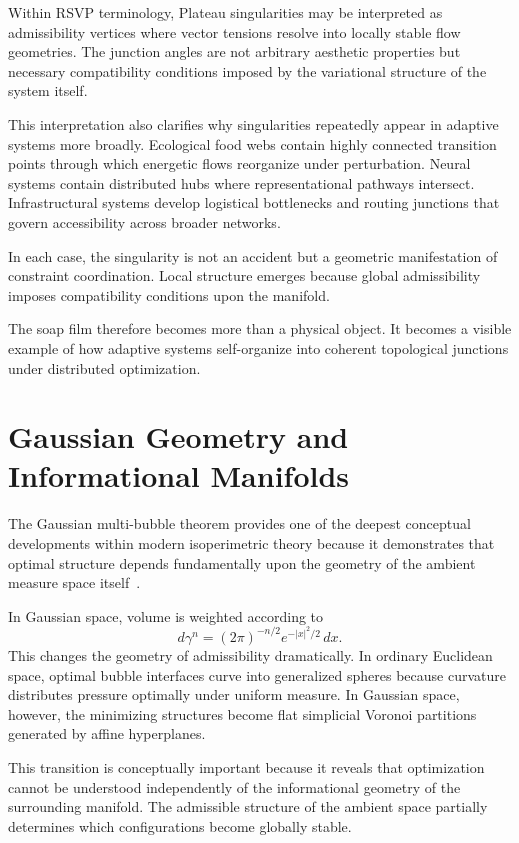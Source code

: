 \documentclass[11pt,a4paper]{article}
\begin{document}
Within RSVP terminology, Plateau singularities may be interpreted as admissibility vertices where vector tensions resolve into locally stable flow geometries. The junction angles are not arbitrary aesthetic properties but necessary compatibility conditions imposed by the variational structure of the system itself.

This interpretation also clarifies why singularities repeatedly appear in adaptive systems more broadly. Ecological food webs contain highly connected transition points through which energetic flows reorganize under perturbation. Neural systems contain distributed hubs where representational pathways intersect. Infrastructural systems develop logistical bottlenecks and routing junctions that govern accessibility across broader networks.

In each case, the singularity is not an accident but a geometric manifestation of constraint coordination. Local structure emerges because global admissibility imposes compatibility conditions upon the manifold.

The soap film therefore becomes more than a physical object. It becomes a visible example of how adaptive systems self-organize into coherent topological junctions under distributed optimization.

\newpage

\section{Gaussian Geometry and Informational Manifolds}

The Gaussian multi-bubble theorem provides one of the deepest conceptual developments within modern isoperimetric theory because it demonstrates that optimal structure depends fundamentally upon the geometry of the ambient measure space itself~\cite{Milman2025}.

In Gaussian space, volume is weighted according to
\[
d\gamma^n
=
(2\pi)^{-n/2}e^{-|x|^2/2}\,dx.
\]
This changes the geometry of admissibility dramatically. In ordinary Euclidean space, optimal bubble interfaces curve into generalized spheres because curvature distributes pressure optimally under uniform measure. In Gaussian space, however, the minimizing structures become flat simplicial Voronoi partitions generated by affine hyperplanes.

This transition is conceptually important because it reveals that optimization cannot be understood independently of the informational geometry of the surrounding manifold. The admissible structure of the ambient space partially determines which configurations become globally stable.
\end{document}
